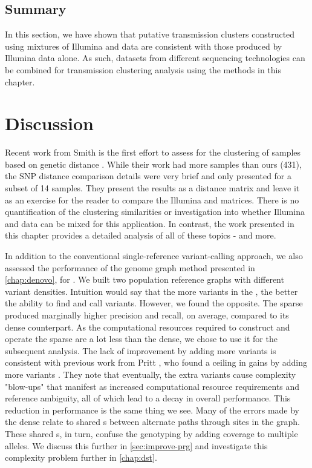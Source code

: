 \subsection{Summary}

In this section, we have shown that putative transmission clusters constructed using mixtures of Illumina and \ont{} data are consistent with those produced by Illumina data alone. As such, datasets from different sequencing technologies can be combined for transmission clustering analysis using the methods in this chapter.


\section{Discussion}

Recent work from Smith \etal{} is the first effort to assess \ont{} for the clustering of \mtb{} samples based on genetic distance \cite{smith2020}. While their work had more samples than ours (431), the SNP distance comparison details were very brief and only presented for a subset of 14 samples. They present the results as a distance matrix and leave it as an exercise for the reader to compare the Illumina and \ont{} matrices. There is no quantification of the clustering similarities or investigation into whether Illumina and \ont{} data can be mixed for this application. In contrast, the work presented in this chapter provides a detailed analysis of all of these topics - and more.

In addition to the conventional single-reference variant-calling approach, we also assessed the performance of the genome graph method presented in \autoref{chap:denovo}, for \mtb{}. We built two \mtb{} population reference graphs with different variant densities. Intuition would say that the more variants in the \panrg{}, the better the ability to find and call variants. However, we found the opposite. The sparse \panrg{} produced marginally higher precision and recall, on average, compared to its dense counterpart. As the computational resources required to construct and operate the sparse \panrg{} are a lot less than the dense, we chose to use it for the subsequent analysis. The lack of improvement by adding more variants is consistent with previous work from Pritt \etal{}, who found a ceiling in gains by adding more variants \cite{pritt2018}. They note that eventually, the extra variants cause complexity "blow-ups" that manifest as increased computational resource requirements and reference ambiguity, all of which lead to a decay in overall performance. This reduction in performance is the same thing we see. Many of the errors made by the dense \panrg{} relate to shared \kmer{}s between alternate paths through sites in the graph. These shared \kmer{}s, in turn, confuse the genotyping by adding coverage to multiple alleles. We discuss this further in \autoref{sec:improve-prg} and investigate this complexity problem further in \autoref{chap:dst}.

